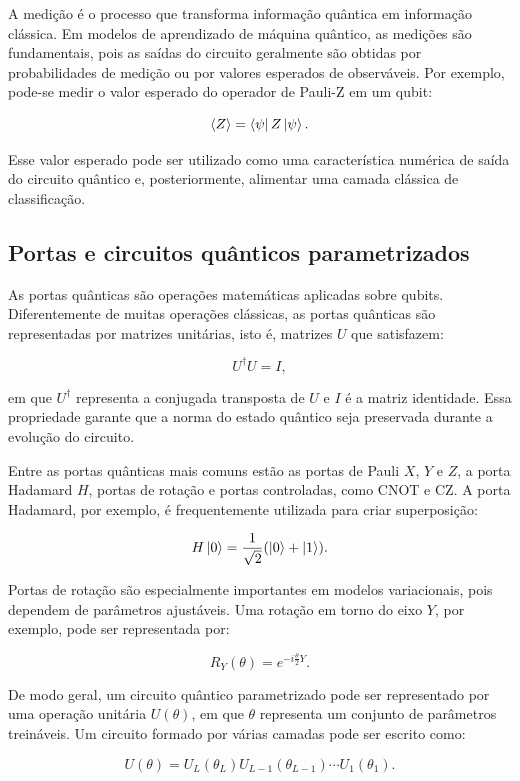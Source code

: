 \documentclass[
    12pt,
    openright,
    oneside,
    a4paper,
    english,
    brazil
]{abntex2}
\begin{document}
A medição é o processo que transforma informação quântica em informação clássica. Em modelos de aprendizado de máquina quântico, as medições são fundamentais, pois as saídas do circuito geralmente são obtidas por probabilidades de medição ou por valores esperados de observáveis. Por exemplo, pode-se medir o valor esperado do operador de Pauli-Z em um qubit:

\[
\langle Z \rangle =
\bra{\psi} Z \ket{\psi}.
\]

Esse valor esperado pode ser utilizado como uma característica numérica de saída do circuito quântico e, posteriormente, alimentar uma camada clássica de classificação.

\subsection{Portas e circuitos quânticos parametrizados}

As portas quânticas são operações matemáticas aplicadas sobre qubits. Diferentemente de muitas operações clássicas, as portas quânticas são representadas por matrizes unitárias, isto é, matrizes \(U\) que satisfazem:

\[
U^\dagger U = I,
\]

em que \(U^\dagger\) representa a conjugada transposta de \(U\) e \(I\) é a matriz identidade. Essa propriedade garante que a norma do estado quântico seja preservada durante a evolução do circuito.

Entre as portas quânticas mais comuns estão as portas de Pauli \(X\), \(Y\) e \(Z\), a porta Hadamard \(H\), portas de rotação e portas controladas, como CNOT e CZ. A porta Hadamard, por exemplo, é frequentemente utilizada para criar superposição:

\[
H\ket{0} =
\frac{1}{\sqrt{2}}
(\ket{0} + \ket{1}).
\]

Portas de rotação são especialmente importantes em modelos variacionais, pois dependem de parâmetros ajustáveis. Uma rotação em torno do eixo \(Y\), por exemplo, pode ser representada por:

\[
R_Y(\theta) =
e^{-i\frac{\theta}{2}Y}.
\]

De modo geral, um circuito quântico parametrizado pode ser representado por uma operação unitária \(U(\theta)\), em que \(\theta\) representa um conjunto de parâmetros treináveis. Um circuito formado por várias camadas pode ser escrito como:

\[
U(\theta) =
U_L(\theta_L)
U_{L-1}(\theta_{L-1})
\cdots
U_1(\theta_1).
\]
\end{document}
